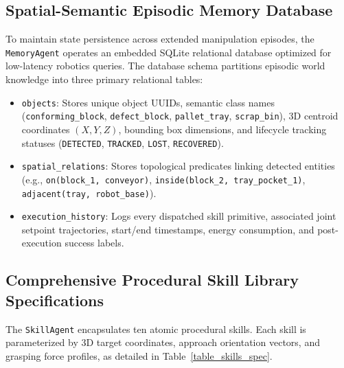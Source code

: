 \documentclass[journal]{IEEEtran}
\begin{document}
\subsection{Spatial-Semantic Episodic Memory Database}
To maintain state persistence across extended manipulation episodes, the \texttt{MemoryAgent} operates an embedded SQLite relational database optimized for low-latency robotics queries. The database schema partitions episodic world knowledge into three primary relational tables:
\begin{itemize}
    \item \texttt{objects}: Stores unique object UUIDs, semantic class names (\texttt{conforming\_block}, \texttt{defect\_block}, \texttt{pallet\_tray}, \texttt{scrap\_bin}), 3D centroid coordinates $(X, Y, Z)$, bounding box dimensions, and lifecycle tracking statuses (\texttt{DETECTED}, \texttt{TRACKED}, \texttt{LOST}, \texttt{RECOVERED}).
    \item \texttt{spatial\_relations}: Stores topological predicates linking detected entities (e.g., \texttt{on(block\_1, conveyor)}, \texttt{inside(block\_2, tray\_pocket\_1)}, \texttt{adjacent(tray, robot\_base)}).
    \item \texttt{execution\_history}: Logs every dispatched skill primitive, associated joint setpoint trajectories, start/end timestamps, energy consumption, and post-execution success labels.
\end{itemize}

\subsection{Comprehensive Procedural Skill Library Specifications}
The \texttt{SkillAgent} encapsulates ten atomic procedural skills. Each skill is parameterized by 3D target coordinates, approach orientation vectors, and grasping force profiles, as detailed in Table~\ref{table_skills_spec}.
\end{document}
